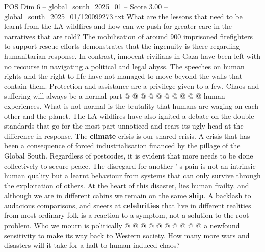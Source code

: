 \begin{textsample}{POS Dim 6 – global\_south\_2025\_01 – Score 3.00 – global\_south\_2025\_01/120099273.txt}
What are the lessons that need to be learnt from the LA wildfires and how can we push for greater care in the narratives that are told?
The mobilisation of around 900 imprisoned firefighters to support rescue efforts demonstrates that the ingenuity is there regarding humanitarian response.
In contrast, innocent civilians in Gaza have been left with no recourse in navigating a political and legal abyss.
The speeches on human rights and the right to life have not managed to move beyond the walls that contain them.
Protection and assistance are a privilege given to a few.
Chaos and suffering will always be a normal part @ @ @ @ @ @ @ @ @ @ human experiences.
What is not normal is the brutality that humans are waging on each other and the planet.
The LA wildfires have also ignited a debate on the double standards that go for the most part unnoticed and rears its ugly head at the difference in response.
The \textbf{climate} crisis is our shared crisis.
A crisis that has been a consequence of forced industrialisation financed by the pillage of the Global South.
Regardless of postcodes, it is evident that more needs to be done collectively to secure peace.
The disregard for another ' s pain is not an intrinsic human quality but a learnt behaviour from systems that can only survive through the exploitation of others.
At the heart of this disaster, lies human frailty, and although we are in different cabins we remain on the same \textbf{ship}.
A backlash to audacious comparisons, and sneers at \textbf{celebrities} that live in different realities from most ordinary folk is a reaction to a symptom, not a solution to the root problem.
Who we mourn is politically @ @ @ @ @ @ @ @ @ @ a newfound sensitivity to make its way back to Western society.
How many more wars and disasters will it take for a halt to human induced chaos?

\end{textsample}
